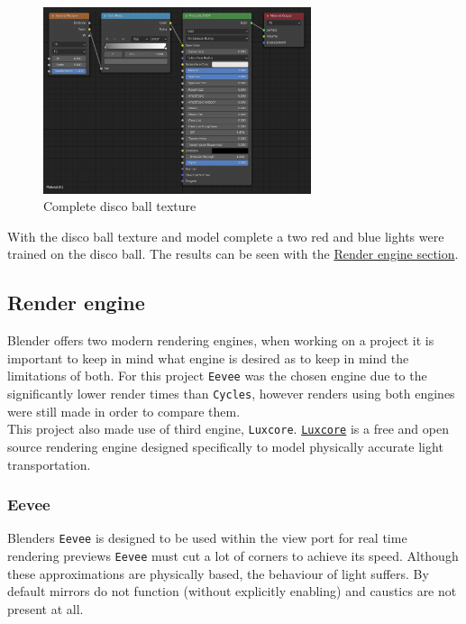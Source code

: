 \documentclass[11pt]{article}
\begin{document}
\begin{figure}[htbp]
\centering
\includegraphics[width=0.7\textwidth]{Images/discoball_texture.png}
\caption{Complete disco ball texture}
\end{figure}
\newpage
With the disco ball texture and model complete a two red and blue lights were
trained on the disco ball. The results can be seen with the \hyperref[sec:org2a31c55]{Render engine section}.
\subsection{Render engine}
\label{sec:org2a31c55}
Blender offers two modern rendering engines, when working on a project it is
important to keep in mind what engine is desired as to keep in mind the
limitations of both. For this project \texttt{Eevee} was the chosen engine due to the
significantly lower render times than \texttt{Cycles}, however renders using both
engines were still made in order to compare them.\\

This project also made use of third engine, \texttt{Luxcore}. \href{https://luxcorerender.org/}{\texttt{Luxcore}} is a free and
open source rendering engine designed specifically to model physically accurate
light transportation.
\newpage
\subsubsection{Eevee}
\label{sec:org8bf6a30}
Blenders \texttt{Eevee} is designed to be used within the view port for real time rendering previews
\texttt{Eevee} must cut a lot of corners to achieve its speed. Although these
approximations are physically based, the behaviour of light suffers. By default
mirrors do not function (without explicitly enabling) and caustics are not present at all.\\
\end{document}
